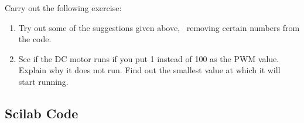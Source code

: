 
\begin{exercise}
  Carry out the following exercise:
  \begin{enumerate}
    \item Try out some of the suggestions given above, \ie\ removing
          certain numbers from the code. 
    \item See if the DC motor runs if you put 1 instead of 100 as the PWM
          value.  Explain why it does not run.  Find out the smallest value at
          which it will start running.
  \end{enumerate}
\end{exercise}




\subsection{Scilab Code}
\label{sec:dcmotor-scilab-code}

